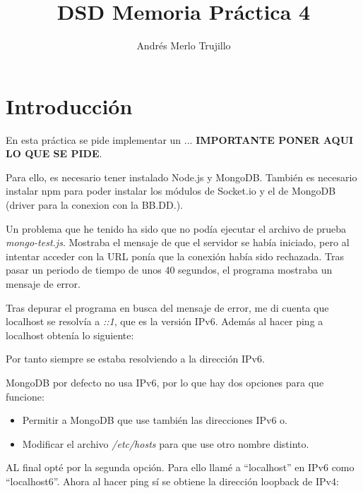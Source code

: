 \documentclass{article}
\title{DSD Memoria Práctica 4}
\author{Andrés Merlo Trujillo}
\date{}
\begin{document}

\maketitle

\tableofcontents

\newpage

\section{Introducción}
En esta práctica se pide implementar un ... \textbf{IMPORTANTE PONER AQUI LO QUE SE PIDE}.

Para ello, es necesario tener instalado Node.js y MongoDB. También es necesario instalar npm para poder instalar los módulos de Socket.io y el de MongoDB (driver para la conexion con la BB.DD.).

Un problema que he tenido ha sido que no podía ejecutar el archivo de prueba \textit{mongo-test.js}. Mostraba el mensaje de que el servidor se había iniciado, pero al intentar acceder con la URL ponía que la conexión había sido rechazada. Tras pasar un periodo de tiempo de unos 40 segundos, el programa mostraba un mensaje de error.


Tras depurar el programa en busca del mensaje de error, me di cuenta que localhost se resolvía a \textit{::1}, que es la versión IPv6. Además al hacer ping a localhost obtenía lo siguiente:


Por tanto siempre se estaba resolviendo a la dirección IPv6.

MongoDB por defecto no usa IPv6, por lo que hay dos opciones para que funcione:

\begin{itemize}
    \item Permitir a MongoDB que use también las direcciones IPv6 o.
    
    \item Modificar el archivo \textit{/etc/hosts} para que use otro nombre distinto.
\end{itemize}

AL final opté por la segunda opción. Para ello llamé a ``localhost'' en IPv6 como ``localhost6''. Ahora al hacer ping sí se obtiene la dirección loopback de IPv4:
\end{document}
